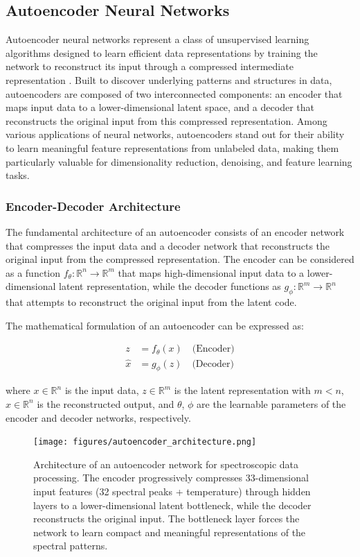 \subsection{Autoencoder Neural Networks}

Autoencoder neural networks represent a class of unsupervised learning algorithms designed to learn efficient data representations by training the network to reconstruct its input through a
compressed intermediate representation \cite{autoencoder_ref}. Built to discover underlying patterns and structures in data, autoencoders are composed of two interconnected components: an encoder
that maps input data to a lower-dimensional latent space, and a decoder that reconstructs the original input from this compressed representation. Among various applications of neural networks,
autoencoders stand out for their ability to learn meaningful feature representations from unlabeled data, making them particularly valuable for dimensionality reduction, denoising, and feature
learning tasks.

\subsubsection{Encoder-Decoder Architecture}

The fundamental architecture of an autoencoder consists of an encoder network that compresses the input data and a decoder network that reconstructs the original input from the compressed
representation. The encoder can be considered as a function $f_{\theta}: \mathbb{R}^n \rightarrow \mathbb{R}^m$ that maps high-dimensional input data to a lower-dimensional latent representation,
while the decoder functions as $g_{\phi}: \mathbb{R}^m \rightarrow \mathbb{R}^n$ that attempts to reconstruct the original input from the latent code.

The mathematical formulation of an autoencoder can be expressed as:

\begin{align}
z &= f_{\theta}(x) \quad \text{(Encoder)} \\
\hat{x} &= g_{\phi}(z) \quad \text{(Decoder)}
\end{align}

where $x \in \mathbb{R}^n$ is the input data, $z \in \mathbb{R}^m$ is the latent representation with $m < n$, $\hat{x} \in \mathbb{R}^n$ is the reconstructed output, and $\theta$, $\phi$ are the
learnable parameters of the encoder and decoder networks, respectively.

\begin{figure}[htbp]
  \centering
  \texttt{[image: figures/autoencoder\_architecture.png]}
  \caption{Architecture of an autoencoder network for spectroscopic data processing. The encoder progressively compresses 33-dimensional input features (32 spectral peaks + temperature) through
hidden layers to a lower-dimensional latent bottleneck, while the decoder reconstructs the original input. The bottleneck layer forces the network to learn compact and meaningful representations
of the spectral patterns.}
  \label{fig:autoencoder_arch}
\end{figure}

